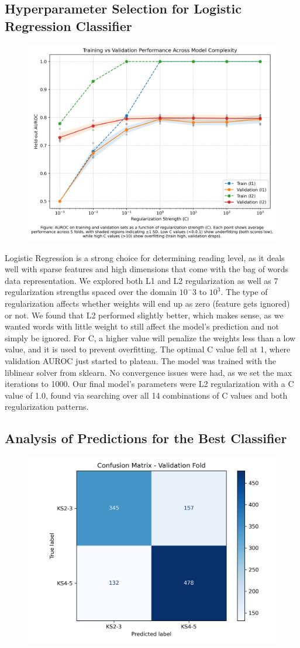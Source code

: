 \documentclass{article}
\begin{document}
\subsection{Hyperparameter Selection for Logistic Regression Classifier}

\begin{figure}[H]
    \centering
    \includegraphics[width=0.55\linewidth]{../p1_hyperparam_train_val_curve.png}
\end{figure}
\newpage
Logistic Regression is a strong choice for determining reading level, as it deals well with sparse features and high dimensions that come with the bag of words data representation. We explored both L1 and L2 regularization as well as 7 regularization strengths spaced over the domain $10^-3$ to $10^3$. The type of regularization affects whether weights will end up as zero (feature gets ignored) or not. We found that L2 performed slightly better, which makes sense, as we wanted words with little weight to still affect the model's prediction and not simply be ignored. For C, a higher value will penalize the weights less than a low value, and it is used to prevent overfitting. The optimal C value fell at 1, where validation AUROC just started to plateau. The model was trained with the liblinear solver from sklearn. No convergence issues were had, as we set the max iterations to 1000. Our final model's parameters were L2 regularization with a C value of 1.0, found via searching over all 14 combinations of C values and both regularization patterns.

\subsection{Analysis of Predictions for the Best Classifier}

\begin{figure}[H]
    \centering
    \includegraphics[width=0.55\linewidth]{../p1_confusion_matrix.png}
\end{figure}
\end{document}
